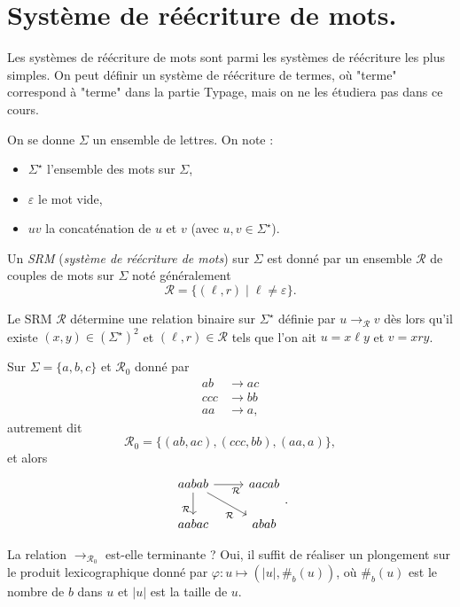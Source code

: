 \documentclass[../main]{subfiles}
\begin{document}
  \section{Système de réécriture de mots.}

  Les systèmes de réécriture de mots sont parmi les systèmes de réécriture les plus simples.
  On peut définir un système de réécriture de termes, où "terme" correspond à "terme" dans la partie Typage, mais on ne les étudiera pas dans ce cours.

  \begin{defn}
    On se donne $\Sigma$ un ensemble de lettres.
    On note :
    \begin{itemize}
      \item $\Sigma^\star$ l'ensemble des mots sur $\Sigma$,
      \item $\varepsilon$ le mot vide,
      \item $uv$ la concaténation de $u$ et $v$ (avec $u,v \in \Sigma^\star$).
    \end{itemize}
  \end{defn}

  \begin{defn}
    Un \textit{SRM} (\textit{système de réécriture de mots}) sur $\Sigma$ est donné par un ensemble $\mathcal{R}$ de couples de mots sur $\Sigma$ noté généralement  \[
    \mathcal{R} = \{(\ell,r)  \mid \ell \neq \varepsilon\} 
    .\]

    Le SRM $\mathcal{R}$ détermine une relation binaire sur $\Sigma^\star$ définie par $u \to_\mathcal{R} v$
    dès lors qu'il existe $(x,y) \in (\Sigma^\star)^2$ et $(\ell,r) \in \mathcal{R}$ tels que l'on ait $u = x \ell y$ et $v = x r y$.
  \end{defn}

  \begin{exm}
    Sur $\Sigma = \{a,b,c\}$ et $\mathcal{R}_0$ donné par
    \begin{align*}
      ab & \to ac \\
      ccc & \to bb \\
      aa &\to a
    ,\end{align*}
    autrement dit \[
    \mathcal{R}_0 = \{(ab, ac), (c c c, b b), (aa, a)\} 
    ,\] 
    et alors 
    \[
    \begin{tikzcd}
      aabab \arrow[swap,near end]{r}{\mathcal{R}} \arrow[swap,near end]{dr}{\mathcal{R}} \arrow[swap,near end]{d}{\mathcal{R}} & aacab\\
      aabac & ab ab
    \end{tikzcd}
    .\]

    La relation $\to_{\mathcal{R}_0}$ est-elle terminante ?
    Oui, il suffit de réaliser un plongement sur le produit lexicographique donné par $\varphi : u \mapsto (|u|, \#_b(u))$, où $\#_b(u)$ est le nombre de  $b$ dans $u$ et $|u|$ est la taille de $u$.
  \end{exm}
\end{document}
